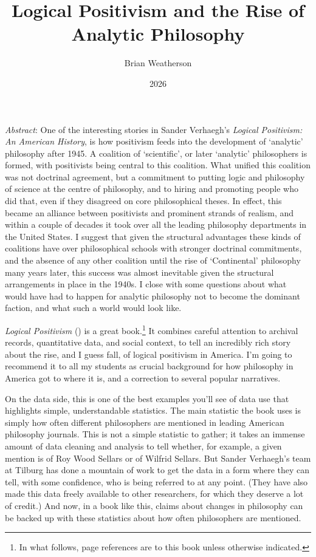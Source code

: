 \documentclass[
  11pt,
  letterpaper,
  DIV=11,
  numbers=noendperiod,
  twoside]{scrartcl}
\title{Logical Positivism and the Rise of Analytic Philosophy}
\author{Brian Weatherson}
\date{2026}
\renewenvironment{abstract}
 {\vspace{-1.25cm}
 \quotation\small\noindent\emph{Abstract}:}
 {\endquotation}
\renewenvironment{abstract}
 {\quotation\small\noindent\emph{Abstract}:}
 {\endquotation\vspace{-0.02cm}}
\begin{document}
\maketitle
\begin{abstract}
One of the interesting stories in Sander Verhaegh's \emph{Logical
Positivism: An American History}, is how positivism feeds into the
development of `analytic' philosophy after 1945. A coalition of
`scientific', or later `analytic' philosophers is formed, with
positivists being central to this coalition. What unified this coalition
was not doctrinal agreement, but a commitment to putting logic and
philosophy of science at the centre of philosophy, and to hiring and
promoting people who did that, even if they disagreed on core
philosophical theses. In effect, this became an alliance between
positivists and prominent strands of realism, and within a couple of
decades it took over all the leading philosophy departments in the
United States. I suggest that given the structural advantages these
kinds of coalitions have over philosophical schools with stronger
doctrinal commitments, and the absence of any other coalition until the
rise of `Continental' philosophy many years later, this success was
almost inevitable given the structural arrangements in place in the
1940s. I close with some questions about what would have had to happen
for analytic philosophy not to become the dominant faction, and what
such a world would look like.
\end{abstract}


\emph{Logical Positivism} ()
is a great book.\footnote{In what follows, page references are to this
  book unless otherwise indicated.} It combines careful attention to
archival records, quantitative data, and social context, to tell an
incredibly rich story about the rise, and I guess fall, of logical
positivism in America. I'm going to recommend it to all my students as
crucial background for how philosophy in America got to where it is, and
a correction to several popular narratives.

On the data side, this is one of the best examples you'll see of data
use that highlights simple, understandable statistics. The main
statistic the book uses is simply how often different philosophers are
mentioned in leading American philosophy journals. This is not a simple
statistic to gather; it takes an immense amount of data cleaning and
analysis to tell whether, for example, a given mention is of Roy Wood
Sellars or of Wilfrid Sellars. But Sander Verhaegh's team at Tilburg has
done a mountain of work to get the data in a form where they can tell,
with some confidence, who is being referred to at any point. (They have
also made this data freely available to other researchers, for which
they deserve a lot of credit.) And now, in a book like this, claims
about changes in philosophy can be backed up with these statistics about
how often philosophers are mentioned.
\end{document}
